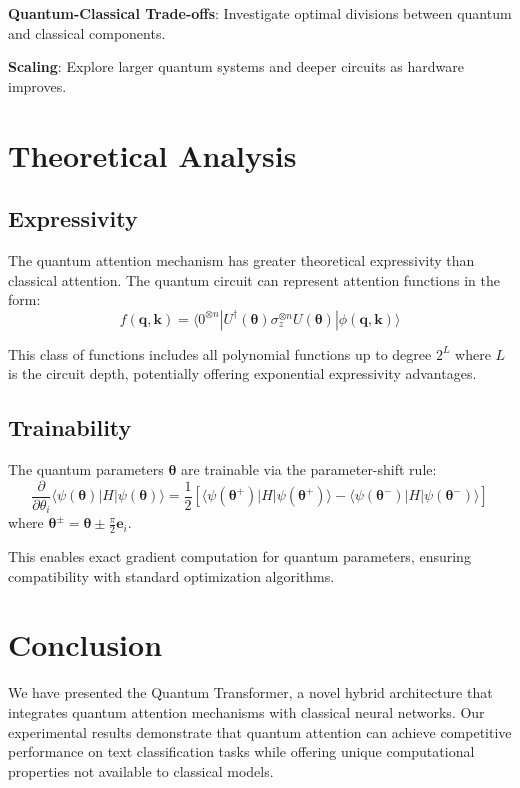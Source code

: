 \documentclass[11pt,twocolumn]{article}
\begin{document}
\textbf{Quantum-Classical Trade-offs}: Investigate optimal divisions between quantum and classical components.

\textbf{Scaling}: Explore larger quantum systems and deeper circuits as hardware improves.

\section{Theoretical Analysis}

\subsection{Expressivity}
The quantum attention mechanism has greater theoretical expressivity than classical attention. The quantum circuit can represent attention functions in the form:
\begin{equation}
f(\mathbf{q}, \mathbf{k}) = \langle 0^{\otimes n} | U^\dagger(\boldsymbol{\theta}) \sigma_z^{\otimes n} U(\boldsymbol{\theta}) | \phi(\mathbf{q}, \mathbf{k}) \rangle
\end{equation}

This class of functions includes all polynomial functions up to degree $2^L$ where $L$ is the circuit depth, potentially offering exponential expressivity advantages.

\subsection{Trainability}
The quantum parameters $\boldsymbol{\theta}$ are trainable via the parameter-shift rule:
\begin{equation}
\frac{\partial}{\partial \theta_i} \langle \psi(\boldsymbol{\theta}) | H | \psi(\boldsymbol{\theta}) \rangle = \frac{1}{2}\left[\langle \psi(\boldsymbol{\theta}^+) | H | \psi(\boldsymbol{\theta}^+) \rangle - \langle \psi(\boldsymbol{\theta}^-) | H | \psi(\boldsymbol{\theta}^-) \rangle\right]
\end{equation}
where $\boldsymbol{\theta}^{\pm} = \boldsymbol{\theta} \pm \frac{\pi}{2}\mathbf{e}_i$.

This enables exact gradient computation for quantum parameters, ensuring compatibility with standard optimization algorithms.

\section{Conclusion}

We have presented the Quantum Transformer, a novel hybrid architecture that integrates quantum attention mechanisms with classical neural networks. Our experimental results demonstrate that quantum attention can achieve competitive performance on text classification tasks while offering unique computational properties not available to classical models.
\end{document}
